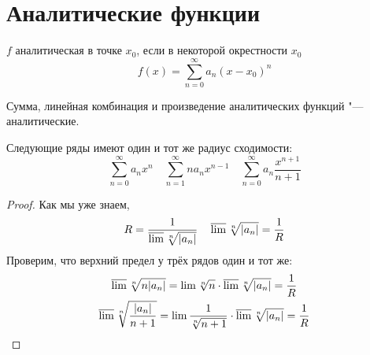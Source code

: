 \section{Аналитические функции}

\begin{Def}
	$f$ аналитическая в точке $x_0$, если в некоторой окрестности $x_0$
	\[ f(x) = \sum_{n=0}^\infty a_n(x - x_0)^n \]
\end{Def}

\begin{Rem}
	Сумма, линейная комбинация и произведение аналитических функций "--- аналитические.
\end{Rem}

\begin{lemma}
	Следующие ряды имеют один и тот же радиус сходимости:
	\[ \sum_{n=0}^\infty a_n x^n \quad \sum_{n=1}^\infty na_nx^{n-1} \quad \sum_{n=0}^\infty a_n \frac{x^{n+1}}{n+1} \]
\end{lemma}
\begin{proof}
	Как мы уже знаем,
	\[ R = \frac1{\varlimsup \sqrt[n]{|a_n|}} \quad \varlimsup \sqrt[n]{|a_n|} = \frac1R \]
	Проверим, что верхний предел у трёх рядов один и тот же:
	\begin{gather*}
		\varlimsup \sqrt[n]{n|a_n|} = \lim \sqrt[n]n \cdot \varlimsup \sqrt[n]{|a_n|} = \frac1R \\
		\varlimsup \sqrt[n]{\frac{|a_n|}{n+1}} = \lim \frac1{\sqrt[n]{n+1}} \cdot \varlimsup \sqrt[n]{|a_n|} = \frac1R
	\end{gather*}
\end{proof}

